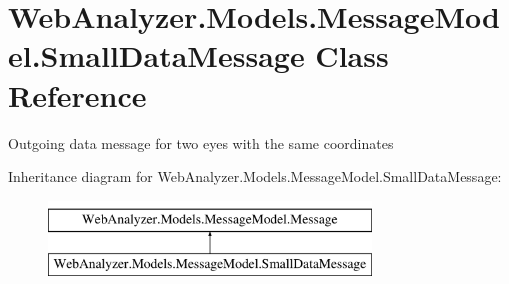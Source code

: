 \hypertarget{class_web_analyzer_1_1_models_1_1_message_model_1_1_small_data_message}{}\section{Web\+Analyzer.\+Models.\+Message\+Model.\+Small\+Data\+Message Class Reference}
\label{class_web_analyzer_1_1_models_1_1_message_model_1_1_small_data_message}


Outgoing data message for two eyes with the same coordinates  


Inheritance diagram for Web\+Analyzer.\+Models.\+Message\+Model.\+Small\+Data\+Message\+:\begin{figure}[H]
\begin{center}
\leavevmode
\includegraphics[height=2.000000cm]{class_web_analyzer_1_1_models_1_1_message_model_1_1_small_data_message}
\end{center}
\end{figure}
